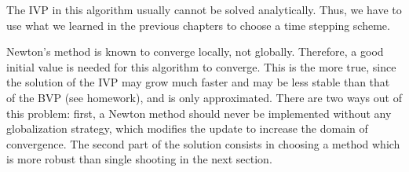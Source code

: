 \begin{remark}
  The IVP in this algorithm usually cannot be solved
  analytically. Thus, we have to use what we learned in the previous
  chapters to choose a time stepping scheme.

  Newton's method is known to converge locally, not
  globally. Therefore, a good initial value is needed for this
  algorithm to converge. This is the more true, since the solution of
  the IVP may grow much faster and may be less stable than that of the
  BVP (see homework), and is only approximated. There are two ways out
  of this problem: first, a Newton method should never be implemented
  without any globalization strategy, which modifies the update to
  increase the domain of convergence. The second part of the solution
  consists in choosing a method which is more robust than single
  shooting in the next section.
\end{remark}

